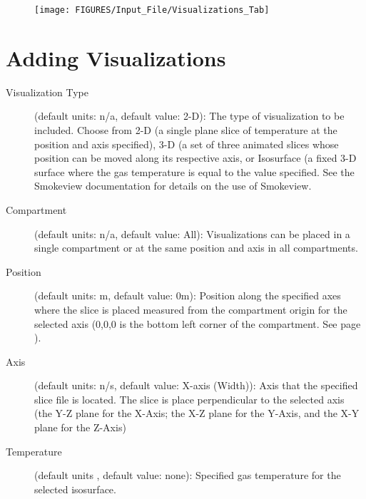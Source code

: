 \begin{figure}[h!]
\begin{center}
\texttt{[image: FIGURES/Input\_File/Visualizations\_Tab]}
\end{center}
\end{figure}

\section{Adding Visualizations}

\begin{description}
\item[Visualization Type] (default units: n/a, default value: 2-D): The type of visualization to be included. Choose from 2-D (a single plane slice of temperature at the position and axis specified), 3-D (a set of three animated slices whose position can be moved along its respective axis, or Isosurface (a fixed 3-D surface where the gas temperature is equal to the value specified. See the Smokeview documentation \cite{Smokeview_Users_Guide_6}for details on the use of Smokeview.

\item[Compartment] (default units: n/a, default value: All): Visualizations can be placed in a single compartment or at the same position and axis in all compartments.

\item[Position] (default units: m, default value: 0m): Position along the specified axes where the slice is placed measured from the compartment origin for the selected axis (0,0,0 is the bottom left corner of the compartment. See page \pageref{Compartment_Geometry}).

\item[Axis] (default units: n/s, default value: X-axis (Width)): Axis that the specified slice file is located.  The slice is place perpendicular to the selected axis (the Y-Z plane for the X-Axis; the X-Z plane for the Y-Axis, and the X-Y plane for the Z-Axis)

\item[Temperature] (default units \degc, default value: none): Specified gas temperature for the selected isosurface.
\end{description}


